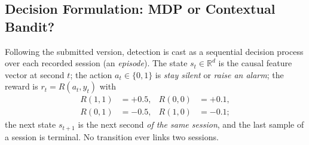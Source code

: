 \subsection{Decision Formulation: MDP or Contextual Bandit?}
\label{sec:formulation}
Following the submitted version, detection is cast as a sequential decision process over each recorded session (an \emph{episode}). The state $s_t\in\mathbb{R}^d$ is the causal feature vector at second $t$; the action $a_t\in\{0,1\}$ is \emph{stay silent} or \emph{raise an alarm}; the reward is $r_t=R(a_t,y_t)$ with
\begin{equation}
\begin{aligned}
R(1,1)&=+0.5, & R(0,0)&=+0.1,\\
R(0,1)&=-0.5, & R(1,0)&=-0.1;
\end{aligned}
\label{eq:reward}
\end{equation}
the next state $s_{t+1}$ is the next second \emph{of the same session}, and the last sample of a session is terminal. No transition ever links two sessions.

